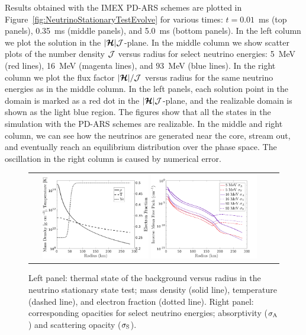 Results obtained with the IMEX PD-ARS schemes are plotted in Figure~\ref{fig:NeutrinoStationaryTestEvolve} for various times: $t=0.01$~ms (top panels), 0.35~ms (middle panels), and 5.0~ms (bottom panels).  
In the left column we plot the solution in the $|\boldsymbol{\mathcal{H}}|\mathcal{J}$-plane.  
In the middle column we show scatter plots of the number density $\mathcal{J}$ versus radius for select neutrino energies: 5~MeV (red lines), 16~MeV (magenta lines), and $93$~MeV (blue lines).  
In the right column we plot the flux factor $|\boldsymbol{\mathcal{H}}|/\mathcal{J}$ versus radius for the same neutrino energies as in the middle column. 
In the left panels, each solution point in the domain is marked as a red dot in the $|\boldsymbol{\mathcal{H}}|\mathcal{J}$-plane, and the realizable domain is shown as the light blue region.  
The figures show that all the states in the simulation with the PD-ARS schemes are realizable.
In the middle and right column, we can see how the neutrinos are generated near the core, stream out, and eventually reach an equilibrium distribution over the phase space.
The oscillation in the right column is caused by numerical error.

\begin{figure}[h]
  \centering
  \begin{tabular}{cc}
    \includegraphics[width=0.45\textwidth]{figures/NStatinaryS_EOS}
    \hspace{30pt}
    \includegraphics[width=0.45\textwidth]{figures/NSS_Opacities}
  \end{tabular}
   \caption{Left panel: thermal state of the background versus radius in the neutrino stationary state test; mass density (solid line), temperature (dashed line), and electron fraction (dotted line).  Right panel: corresponding opacities for select neutrino energies; absorptivity ($\sigma_{{\rm A}}$) and scattering opacity ($ \sigma_{{\rm S}}$).}
   \label{fig:NeutrinoStationaryTestEOS}
\end{figure}

